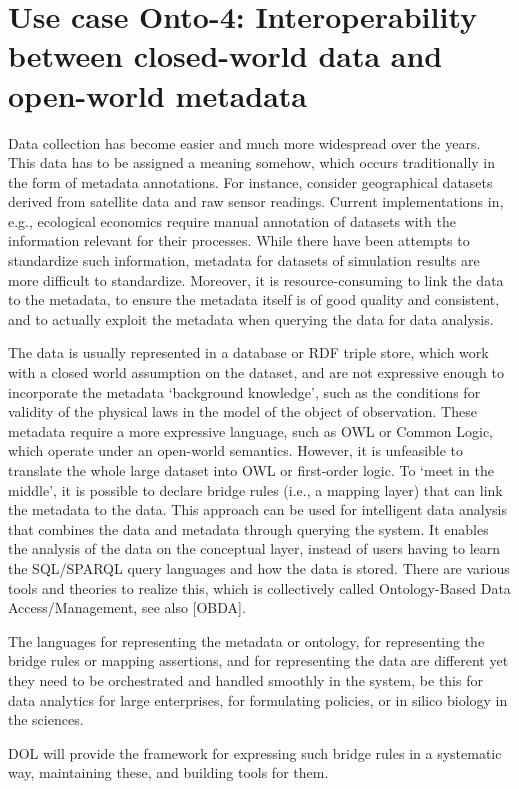 \documentclass[10pt,%
\ifpretendfinal
final%
\else
draft%
\fi,
]{scrreprt}
\begin{document}
\section{Use case Onto-4: Interoperability between closed-world data and open-world metadata}
Data collection has become easier and much more widespread over the years. This data has to be assigned a meaning somehow, which occurs traditionally in the 
form of metadata annotations. For instance, consider geographical datasets derived from satellite data and raw sensor readings. Current implementations in, e.g., 
ecological economics require manual annotation of datasets with the information relevant for their processes. While there have been attempts to standardize such 
information, metadata for datasets of simulation results are more difficult to standardize. Moreover, it is resource-consuming to link the data to the metadata, to 
ensure the metadata itself is of good quality and consistent, and to actually exploit the metadata when querying the data for data analysis. 

The data is usually represented in a database or RDF triple store, which work with a closed world assumption on the dataset, and are not expressive enough to 
incorporate the metadata `background knowledge', such as the conditions for validity of the physical laws in the model of the object of observation. These metadata 
require a more expressive language, such as OWL or Common Logic, which operate under an open-world semantics. However, it is unfeasible to translate the 
whole large dataset into OWL or first-order logic. To `meet in the middle', it is possible to declare bridge rules (i.e., a mapping layer) that can link the metadata to 
the data. This approach can be used for intelligent data analysis that combines the data and metadata through querying the system. It enables the analysis of the 
data on the conceptual layer, instead of users having to learn the SQL/SPARQL query languages and how the data is stored. There are various tools and theories 
to realize this, which is collectively called Ontology-Based Data Access/Management, see also [OBDA].

The languages for representing the metadata or ontology, for representing the bridge rules or mapping assertions, and for representing the data are different yet 
they need to be orchestrated and handled smoothly in the system, be this for data analytics for large enterprises, for formulating policies, or in silico biology in the 
sciences. 

DOL will provide the framework for expressing such bridge rules in a systematic way, maintaining these, and building tools for them. 
\end{document}

